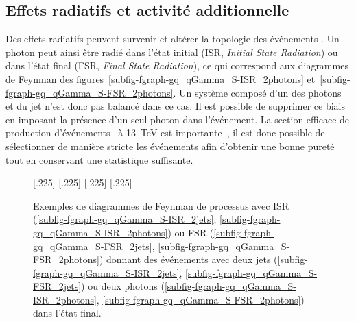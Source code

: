 \subsection{Effets radiatifs et activité additionnelle}\label{chapter-JERC-section-pheno-GJets-subsec-alpha_definition}
Des effets radiatifs peuvent survenir et altérer la topologie des événements \Gjets.
Un photon peut ainsi être radié dans l'état initial (ISR, \emph{Initial State Radiation}) ou dans l'état final (FSR, \emph{Final State Radiation}), ce qui correspond aux diagrammes de Feynman des figures~\ref{subfig-fgraph-gq_qGamma_S-ISR_2photons} et~\ref{subfig-fgraph-gq_qGamma_S-FSR_2photons}.
Un système composé d'un des photons et du jet n'est donc pas balancé dans ce cas.
Il est possible de supprimer ce biais en imposant la présence d'un seul photon dans l'événement.
La section efficace de production d'événements \Gjets\ à \SI{13}{\TeV} est importante~\cite{Gjet_xsec_2018}, il est donc possible de sélectionner de manière stricte les événements afin d'obtenir une bonne pureté tout en conservant une statistique suffisante.
\begin{figure}[h]
\centering\vspace{\baselineskip}
\subcaptionbox{\label{subfig-fgraph-gq_qGamma_S-ISR_2jets}}[.225\textwidth]
{\vspace{\baselineskip}}
\hfill
\subcaptionbox{\label{subfig-fgraph-gq_qGamma_S-ISR_2photons}}[.225\textwidth]
{\vspace{\baselineskip}}
\hfill
\subcaptionbox{\label{subfig-fgraph-gq_qGamma_S-FSR_2jets}}[.225\textwidth]
{\vspace{\baselineskip}}
\hfill
\subcaptionbox{\label{subfig-fgraph-gq_qGamma_S-FSR_2photons}}[.225\textwidth]
{\vspace{\baselineskip}}
\caption[Diagrammes de Feynman de processus avec ISR ou FSR.]{Exemples de diagrammes de Feynman de processus avec ISR (\ref{subfig-fgraph-gq_qGamma_S-ISR_2jets}, \ref{subfig-fgraph-gq_qGamma_S-ISR_2photons}) ou FSR (\ref{subfig-fgraph-gq_qGamma_S-FSR_2jets}, \ref{subfig-fgraph-gq_qGamma_S-FSR_2photons}) donnant des événements avec deux jets (\ref{subfig-fgraph-gq_qGamma_S-ISR_2jets}, \ref{subfig-fgraph-gq_qGamma_S-FSR_2jets}) ou deux photons (\ref{subfig-fgraph-gq_qGamma_S-ISR_2photons}, \ref{subfig-fgraph-gq_qGamma_S-FSR_2photons}) dans l'état final.}
\label{fig-fgraph-gamma_plus_jets-ISR-FSR}
\end{figure}
